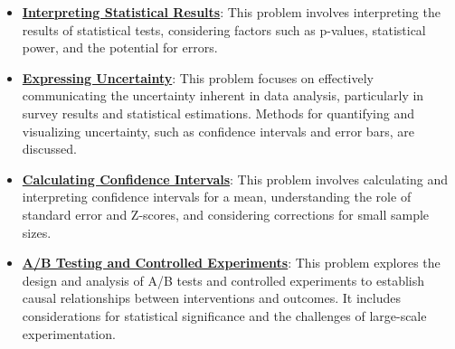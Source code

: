 \documentclass{article}%
\begin{document}
\begin{itemize}[leftmargin=*]
\item \href{https://purdue.brightspace.com/d2l/common/assets/pdfjs-d2l-dist/1.0.14-legacy/web/viewer.html?file=\%2Fcontent\%2Fenforced\%2F1095465-WL.202510.CS24200.LE1\%2F13L2-hypothesis.pdf\%3Fou\%3D1095465\&lang=en-us\&container=d2l-fileviewer-rendered-pdf\&fullscreen=d2l-fileviewer-rendered-pdf-dialog\&height=667#page=37}{\textbf{Interpreting Statistical Results}}: This problem involves interpreting the results of statistical tests, considering factors such as p-values, statistical power, and the potential for errors.%
\end{itemize}%
\begin{itemize}[leftmargin=*]%
\item \href{https://purdue.brightspace.com/d2l/common/assets/pdfjs-d2l-dist/1.0.14-legacy/web/viewer.html?file=\%2Fcontent\%2Fenforced\%2F1095465-WL.202510.CS24200.LE1\%2F15L2-AB-testing.pdf\%3Fou\%3D1095465\&lang=en-us\&container=d2l-fileviewer-rendered-pdf\&fullscreen=d2l-fileviewer-rendered-pdf-dialog\&height=667#page=3}{\textbf{Expressing Uncertainty}}: This problem focuses on effectively communicating the uncertainty inherent in data analysis, particularly in survey results and statistical estimations. Methods for quantifying and visualizing uncertainty, such as confidence intervals and error bars, are discussed.%
\item \href{https://purdue.brightspace.com/d2l/common/assets/pdfjs-d2l-dist/1.0.14-legacy/web/viewer.html?file=\%2Fcontent\%2Fenforced\%2F1095465-WL.202510.CS24200.LE1\%2F15L2-AB-testing.pdf\%3Fou\%3D1095465\&lang=en-us\&container=d2l-fileviewer-rendered-pdf\&fullscreen=d2l-fileviewer-rendered-pdf-dialog\&height=667#page=5}{\textbf{Calculating Confidence Intervals}}: This problem involves calculating and interpreting confidence intervals for a mean, understanding the role of standard error and Z-scores, and considering corrections for small sample sizes.%
\item \href{https://purdue.brightspace.com/d2l/common/assets/pdfjs-d2l-dist/1.0.14-legacy/web/viewer.html?file=\%2Fcontent\%2Fenforced\%2F1095465-WL.202510.CS24200.LE1\%2F15L2-AB-testing.pdf\%3Fou\%3D1095465\&lang=en-us\&container=d2l-fileviewer-rendered-pdf\&fullscreen=d2l-fileviewer-rendered-pdf-dialog\&height=667#page=9}{\textbf{A/B Testing and Controlled Experiments}}: This problem explores the design and analysis of A/B tests and controlled experiments to establish causal relationships between interventions and outcomes. It includes considerations for statistical significance and the challenges of large-scale experimentation.%

\end{itemize}
\end{document}
